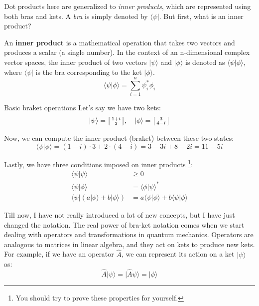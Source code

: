 Dot products here are generalized to \textit{inner products}, which are represented using both bras and kets. A \textit{bra} is simply denoted by \(\langle\psi|\). But first, what is an inner product?
\begin{definition}
  An \textbf{inner product} is a mathematical operation that takes two vectors and produces a scalar (a single number). In the context of an n-dimensional complex vector spaces, the inner product of two vectors \(|\psi\rangle\) and \(|\phi\rangle\) is denoted as \(\langle\psi|\phi\rangle\), where \(\langle\psi|\) is the bra corresponding to the ket \(|\phi\rangle\).
  \begin{equation*}
    \langle\psi|\phi\rangle = \sum_{i=1}^{n} \psi_i^* \phi_i
  \end{equation*}
\end{definition}
\begin{example}{Basic braket operations}{}
  Let's say we have two kets:
  \begin{equation*}
    |\psi\rangle = \begin{bsmallmatrix}
      1 + i \\
      2
    \end{bsmallmatrix}, \quad |\phi\rangle = \begin{bsmallmatrix}
      3 \\
      4 - i
    \end{bsmallmatrix}
  \end{equation*}

  Now, we can compute the inner product (braket) between these two states:
  \begin{equation*}
    \langle\psi|\phi\rangle = (1 - i) \cdot 3 + 2 \cdot (4 - i) = 3 - 3i + 8 - 2i = 11 - 5i
  \end{equation*}
\end{example}


Lastly, we have three conditions imposed on inner products \footnote{You should try to prove these properties for yourself.}:
\begin{align}
  \langle\psi|\psi\rangle &\geq 0 \\
  \langle\psi|\phi\rangle &= \langle\phi|\psi\rangle^*\\
  \langle\psi| (a|\phi\rangle + b|\phi\rangle) &= a\langle\psi|\phi\rangle + b\langle\psi|\phi\rangle
\end{align}


Till now, I have not really introduced a lot of new concepts, but I have just changed the notation. The real power of bra-ket notation comes when we start dealing with operators and transformations in quantum mechanics. Operators are analogous to matrices in linear algebra, and they act on kets to produce new kets. For example, if we have an operator \(\hat{A}\), we can represent its action on a ket \(|\psi\rangle\) as:
\begin{equation}
  \hat{A}|\psi\rangle = |\hat{A}\psi\rangle = |\phi\rangle
\end{equation}


